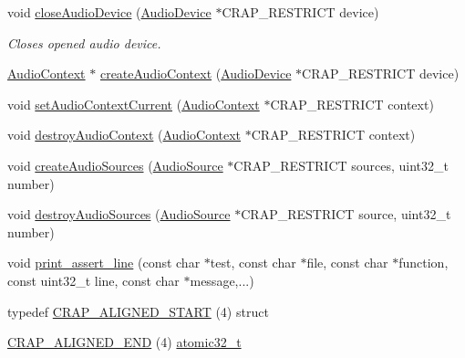 \begin{DoxyCompactItemize}
void \hyperlink{namespacecrap_ae9eb7aeb6dd0d2e93fb4be25d75f65a9}{close\+Audio\+Device} (\hyperlink{namespacecrap_a0554191481198902f832204ecc2db4c0}{Audio\+Device} $\ast$C\+R\+A\+P\+\_\+\+R\+E\+S\+T\+R\+I\+C\+T device)
\begin{DoxyCompactList}\small\item\em Closes opened audio device. \end{DoxyCompactList}\item 
\hyperlink{namespacecrap_a4d9ca11977af369032d36460bc1c80e7}{Audio\+Context} $\ast$ \hyperlink{namespacecrap_a1a6cf0539f6ee95ac516c2828f20f0ec}{create\+Audio\+Context} (\hyperlink{namespacecrap_a0554191481198902f832204ecc2db4c0}{Audio\+Device} $\ast$C\+R\+A\+P\+\_\+\+R\+E\+S\+T\+R\+I\+C\+T device)
\item 
void \hyperlink{namespacecrap_af82fa263b7c572b66b3f94e04064bc34}{set\+Audio\+Context\+Current} (\hyperlink{namespacecrap_a4d9ca11977af369032d36460bc1c80e7}{Audio\+Context} $\ast$C\+R\+A\+P\+\_\+\+R\+E\+S\+T\+R\+I\+C\+T context)
\item 
void \hyperlink{namespacecrap_a66c9a3908f68d40686a473ea0f7faeae}{destroy\+Audio\+Context} (\hyperlink{namespacecrap_a4d9ca11977af369032d36460bc1c80e7}{Audio\+Context} $\ast$C\+R\+A\+P\+\_\+\+R\+E\+S\+T\+R\+I\+C\+T context)
\item 
void \hyperlink{namespacecrap_a554f66d5aba30c378aca3ad8a10f359e}{create\+Audio\+Sources} (\hyperlink{namespacecrap_a462d678db37c6a434145136ab6d59720}{Audio\+Source} $\ast$C\+R\+A\+P\+\_\+\+R\+E\+S\+T\+R\+I\+C\+T sources, uint32\+\_\+t number)
\item 
void \hyperlink{namespacecrap_a7032ad7bf15803aae858c29d787e09bb}{destroy\+Audio\+Sources} (\hyperlink{namespacecrap_a462d678db37c6a434145136ab6d59720}{Audio\+Source} $\ast$C\+R\+A\+P\+\_\+\+R\+E\+S\+T\+R\+I\+C\+T source, uint32\+\_\+t number)
\item 
void \hyperlink{namespacecrap_a5af0b5a586764352edd662c58a5d6c68}{print\+\_\+assert\+\_\+line} (const char $\ast$test, const char $\ast$file, const char $\ast$function, const uint32\+\_\+t line, const char $\ast$message,...)
\item 
typedef \hyperlink{namespacecrap_aa4db5c324bca7af9040282ebca5db226}{C\+R\+A\+P\+\_\+\+A\+L\+I\+G\+N\+E\+D\+\_\+\+S\+T\+A\+R\+T} (4) struct
\item 
\hyperlink{namespacecrap_a40f2b73ae646e41f3534198d19fbb188}{C\+R\+A\+P\+\_\+\+A\+L\+I\+G\+N\+E\+D\+\_\+\+E\+N\+D} (4) \hyperlink{structcrap_1_1atomic32__t}{atomic32\+\_\+t}
\item 

\end{DoxyCompactItemize}
